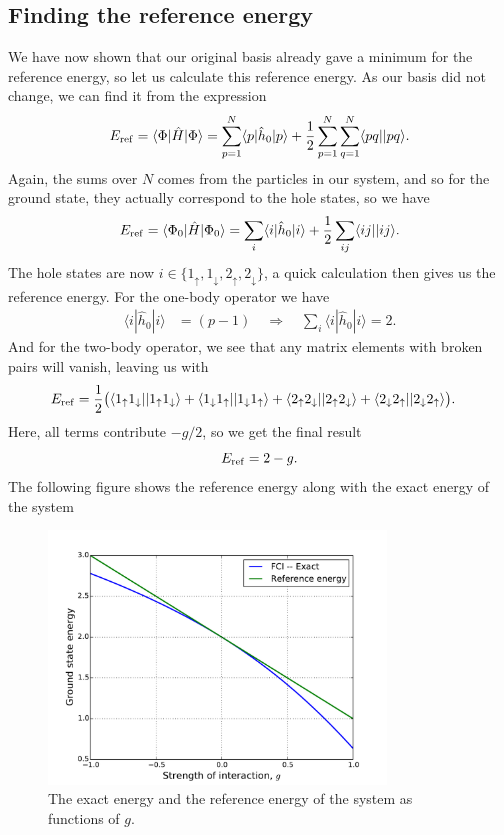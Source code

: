 \documentclass[a4paper, 11pt, notitlepage, english]{article}
\newcommand{\braket}[2]{\langle #1 | #2 \rangle}
\newcommand{\brakket}[2]{\langle #1 || #2 \rangle}
\newcommand{\op}[1]{\hat{#1}}
\newcommand{\braopket}[3]{\langle #1 | {#2} | #3 \rangle}
\renewcommand{\d}{{\rm d}}
\renewcommand{\u}{\uparrow}
\renewcommand{\d}{\downarrow}
\begin{document}
\subsection*{Finding the reference energy}
We have now shown that our original basis already gave a minimum for the reference energy, so let us calculate this reference energy. As our basis did not change, we can find it from the expression
$$E_{\rm ref} = \braopket{\Phi}{\op{H}}{\Phi} = \sum_{p=1}^N \braopket{p}{\op{h}_0}{p} + \frac{1}{2}\sum_{p=1}^N\sum_{q=1}^N\braket{pq|}{pq}.$$
Again, the sums over $N$ comes from the particles in our system, and so for the ground state, they actually correspond to the hole states, so we have
$$E_{\rm ref} = \braopket{\Phi_0}{\op{H}}{\Phi_0} = \sum_{i} \braopket{i}{\op{h}_0}{i} + \frac{1}{2}\sum_{ij} \brakket{ij}{ij}.$$
The hole states are now $i\in\{1_\u, 1_\d, 2_\u, 2_\d \}$, a quick calculation then gives us the reference energy. For the one-body operator we have
\begin{align*}
\braopket{i}{\op{h}_0}{i} &= (p-1) \quad \Rightarrow \quad \sum_{i} \braopket{i}{\op{h}_0}{i} = 2.
\end{align*}
And for the two-body operator, we see that any matrix elements with broken pairs will vanish, leaving us with
\begin{align*}
E_{\rm ref} &=   
\frac{1}{2}\big(
\brakket{1_\u1_\d}{1_\u1_\d} + \brakket{1_\d1_\u}{1_\d1_\u}
+ \brakket{2_\u2_\d}{2_\u2_\d} + \brakket{2_\d2_\u}{2_\d2_\u}
\big).
\end{align*}
Here, all terms contribute $-g/2$, so we get the final result
$$E_{\rm ref} = 2-g.$$
The following figure shows the reference energy along with the exact energy of the system
\begin{figure}
  \centering 
  \includegraphics[width=0.8\textwidth]{proj1_ref2}
  \caption{The exact energy and the reference energy of the system as functions of $g$.}
\end{figure}
\end{document}
